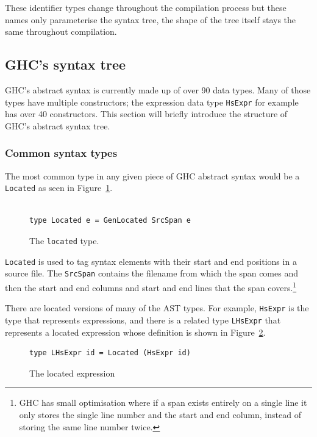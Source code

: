 These identifier types change throughout the compilation process but these names only parameterise the syntax tree, the shape of the tree itself stays the same throughout compilation. 

\subsection{GHC's syntax tree}
GHC's abstract syntax is currently made up of over 90 data types. Many of those types have multiple constructors; the expression data type \texttt{HsExpr} for example has over 40 constructors. This section will briefly introduce the structure of GHC's abstract syntax tree.

\subsubsection{Common syntax types}

The most common type in any given piece of GHC abstract syntax would be a \texttt{Located} as seen in Figure~\ref{located}.

\begin{figure}[t]
\begin{lstlisting}

type Located e = GenLocated SrcSpan e

\end{lstlisting}
\caption{The \texttt{located} type.}
\label{located}
\end{figure}

\texttt{Located} is used to tag syntax elements with their start and end positions in a source file. The \texttt{SrcSpan} contains the filename from which the span comes and then the start and end columns and start and end lines that the span covers.\footnote{GHC has small optimisation where if a span exists entirely on a single line it only stores the single line number and the start and end column, instead of storing the same line number twice.} 

There are located versions of many of the AST types. For example, \texttt{HsExpr} is the type that represents expressions, and there is a related type \texttt{LHsExpr} that represents a located expression whose definition is shown in Figure~\ref{lhsexpr}.

\begin{figure}[t]
\begin{lstlisting}
type LHsExpr id = Located (HsExpr id)
\end{lstlisting}
\caption{The located expression}
\label{lhsexpr}
\end{figure}

